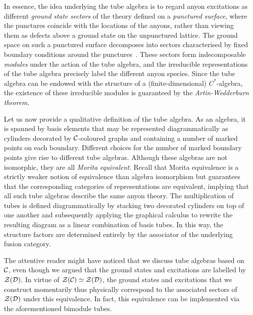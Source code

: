 In essence, the idea underlying the tube algebra is to regard anyon excitations as different \emph{ground state sectors} of the theory defined on a \emph{punctured surface}, where the punctures coincide with the locations of the anyons, rather than viewing them as defects above a ground state on the unpunctured lattice. The ground space on such a punctured surface decomposes into sectors characterised by fixed boundary conditions around the punctures~\cite{Lan2013,Bultinck2015,Williamson2017,Bullivant2019}. These sectors form indecomposable \emph{modules} under the action of the tube algebra, and the irreducible representations of the tube algebra precisely label the different anyon species. Since the tube algebra can be endowed with the structure of a (finite-dimensional) $C^*$-algebra, the existence of these irreducible modules is guaranteed by the \emph{Artin-Wedderburn theorem}.

\bigskip\noindent Let us now provide a qualitative definition of the tube algebra. As an algebra, it is spanned by basis elements that may be represented diagrammatically as cylinders decorated by $\mathcal{C}$-coloured graphs and containing a number of marked points on each boundary. Different choices for the number of marked boundary points give rise to different tube algebras. Although these algebras are not isomorphic, they are all \emph{Morita equivalent}. Recall that Morita equivalence is a strictly weaker notion of equivalence than algebra isomorphism but guarantees that the corresponding categories of representations are equivalent, implying that all such tube algebras describe the same anyon theory. The multiplication of tubes is defined diagrammatically by stacking two decorated cylinders on top of one another and subsequently applying the graphical calculus to rewrite the resulting diagram as a linear combination of basis tubes. In this way, the structure factors are determined entirely by the associator of the underlying fusion category.

The attentive reader might have noticed that we discuss tube algebras based on $\mathcal{C}$, even though we argued that the ground states and excitations are labelled by $\mathcal{Z}(\mathcal{D})$. In virtue of $\mathcal{Z}(\mathcal{C})\simeq\mathcal{Z}(\mathcal{D})$, the ground states and excitations that we construct momentarily thus physically correspond to the associated sectors of $\mathcal{Z}(\mathcal{D})$ under this equivalence. In fact, this equivalence can be implemented via the aforementioned bimodule tubes.

